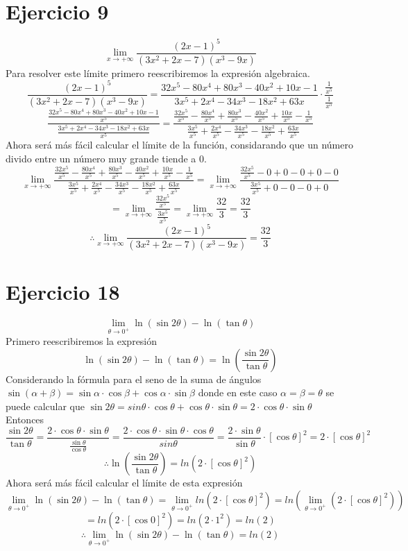 \documentclass[12pt]{article}
\begin{document}
\section{Ejercicio 9}
\[
\lim_{x \to +\infty}\frac{(2x-1)^5}{(3x^2+2x-7)(x^3-9x)}
\]
Para resolver este límite primero reescribiremos la expresión algebraica.
\[
\frac{(2x-1)^5}{(3x^2+2x-7)(x^3-9x)} = \frac{32x^{5}-80x^{4}+80x^{3}-40x^{2}+10x-1}{3x^{5}+2x^{4}-34x^{3}-18x^{2}+63x} \cdot \frac{\frac{1}{x^{5}}}{\frac{1}{x^{5}}}
\]
\[
\frac{ \frac{32x^{5}-80x^{4}+80x^{3}-40x^{2}+10x-1 }{x^{5}}}{ \frac{3x^{5}+2x^{4}-34x^{3}-18x^{2}+63x}{x^{5}}} = \frac{  \frac{32x^{5}}{x^{5}} - \frac{80x^{4}}{x^{5}} + \frac{80x^{3}}{x^{5}} - \frac{40x^{2}}{x^{5}} + \frac{10x}{x^{5}}- \frac{1}{x^{5}} }{
\frac{3x^{5}}{x^{5}} + \frac{2x^{4}}{x^{5}} - \frac{34x^{3}}{x^{5}} - \frac{18x^{2}}{x^{5}} + \frac{63x}{x^{5}}}
\]
Ahora será más fácil calcular el límite de la función, considarando que un número divido entre un número muy grande tiende a 0.
\[
\lim_{x \to +\infty} \frac{  \frac{32x^{5}}{x^{5}} - \frac{80x^{4}}{x^{5}} + \frac{80x^{3}}{x^{5}} - \frac{40x^{2}}{x^{5}} + \frac{10x}{x^{5}}- \frac{1}{x^{5}} }{
\frac{3x^{5}}{x^{5}} + \frac{2x^{4}}{x^{5}} - \frac{34x^{3}}{x^{5}} - \frac{18x^{2}}{x^{5}} + \frac{63x}{x^{5}}} = \lim_{x \to +\infty}  \frac{  \frac{32x^{5}}{x^{5}} - 0 + 0 - 0 + 0- 0 }{
\frac{3x^{5}}{x^{5}} + 0- 0-0+ 0}
\]
\[
 = \lim_{x \to +\infty}  \frac{\frac{32x^{5}}{x^{5}}}{\frac{3x^{5}}{x^{5}}} = \lim_{x \to +\infty} \frac{32}{3} = \frac{32}{3}
\]
\[
\therefore \lim_{x \to +\infty}\frac{(2x-1)^5}{(3x^2+2x-7)(x^3-9x)} = \frac{32}{3}
\]
\section{Ejercicio 18}
\[
\lim_{\theta \to 0^+} \ln (\sin 2\theta) - \ln (\tan \theta)
\]
Primero reescribiremos la expresión
\[
 \ln (\sin 2\theta) - \ln (\tan \theta) = \ln ( \frac{\sin 2\theta}{\tan \theta} ) 
\]
Considerando la fórmula para el seno de la suma de ángulos $ \sin (\alpha + \beta) = \sin \alpha \cdot \cos \beta + \cos \alpha \cdot \sin \beta $ donde en este caso $\alpha = \beta = \theta$ se puede calcular que $\sin 2\theta = sin \theta \cdot \cos \theta  + \cos \theta  \cdot \sin \theta   = 2 \cdot \cos \theta  \cdot \sin \theta $ \\
Entonces 
\[
 \frac{\sin 2\theta}{\tan \theta} = \frac{ 2 \cdot \cos \theta  \cdot \sin \theta}{\frac{\sin \theta}{\cos \theta}} = \frac{2 \cdot \cos \theta  \cdot \sin \theta \cdot \cos \theta}{sin \theta} = \frac{2 \cdot \sin \theta}{\sin \theta} \cdot [\cos \theta]^{2} = 2 \cdot [\cos \theta]^{2}
\]
\[
\therefore \ln ( \frac{ \sin 2 \theta }{ \tan \theta} ) = ln ( 2 \cdot [\cos \theta]^{2} )
\]
Ahora será más fácil calcular el límite de esta expresión
\[
\lim_{\theta \to 0^+} \ln (\sin 2\theta) - \ln (\tan \theta) = \lim_{\theta \to 0^+}  ln ( 2 \cdot [\cos \theta]^{2} ) =  ln ( \lim_{\theta \to 0^+} ( 2 \cdot [\cos \theta]^{2} )) 
\]
\[
= ln (  2 \cdot [\cos 0]^{2}) =ln (  2 \cdot 1^{2})  = ln (2) 
\]
\[
\therefore \lim_{\theta \to 0^+} \ln (\sin 2\theta) - \ln (\tan \theta) =  ln (2) 
\]
\end{document}
